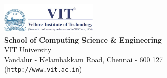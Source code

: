 %
\newpage
\thispagestyle{empty}
\vspace*{\fill}
\begin{flushright}
\includegraphics[width=0.35\textwidth]{logo.png}\\[0.5cm]
{\Large \bf \sf  School of Computing Science \& Engineering \ }\\
{\sf VIT University\\
Vandalur - Kelambakkam Road, Chennai - 600 127\\
({\tt http://www.vit.ac.in})}
\end{flushright}
%